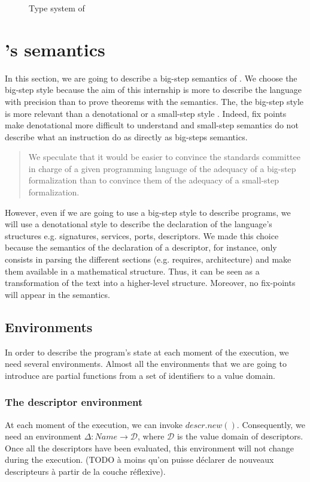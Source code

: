\begin{figure}[ht!]
{{}}
\caption{Type system of \compo{}}


\label{fig:type_syst}
\end{figure}









\chapter{\compo's semantics}
In this section, we are going to describe a big-step semantics of \compo{}. We choose the big-step style because the aim of this internship is more to describe the language with precision than to prove theorems with the semantics. The, the big-step style is more relevant than a denotational or a small-step style \cite{Cha13}. Indeed, fix points make denotational more difficult to understand and small-step semantics do not describe what an instruction do as directly as big-steps semantics.

\blockquote{We speculate that it would be easier to convince the standards committee in charge of a given programming language of the adequacy of a big-step formalization than to convince them of the adequacy of a small-step formalization.}{\cite{Cha13}}

However, even if we are going to use a big-step style to describe programs, we will use a denotational style to describe the declaration of the language's structures e.g. signatures, services, ports, descriptors. We made this choice because the semantics of the declaration of a descriptor, for instance, only consists in parsing the different sections (e.g. requires, architecture) and make them available in a mathematical structure. Thus, it can be seen as a transformation of the text into a higher-level structure. Moreover, no fix-points will appear in the semantics.



\section{Environments}
In order to describe the program's state at each moment of the execution, we need several environments. Almost all the environments that we are going to introduce are partial functions from a set of identifiers to a value domain.

\subsection{The descriptor environment}
At each moment of the execution, we can invoke $descr.new()$. Consequently, we need an environment  $\Delta : Name \rightarrow \mathcal{D}$, where $\mathcal{D}$ is the value domain of descriptors. Once all the descriptors have been evaluated, this environment will not change during the execution.
 (TODO à moins qu'on puisse déclarer de nouveaux descripteurs à partir de la couche réflexive).

